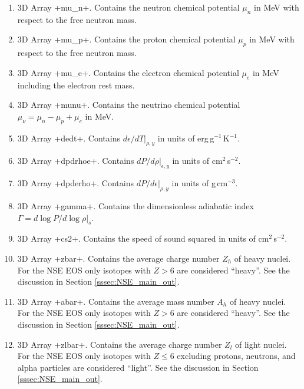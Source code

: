 \documentclass[letterpaper,11pt]{refart}
\begin{document}
\begin{enumerate}
 \item 3D Array \verbprm+mu_n+. Contains the neutron chemical potential $\mu_n$ 
   in MeV with respect to the free neutron mass.

 \item 3D Array \verbprm+mu_p+. Contains the proton chemical potential $\mu_p$ 
   in MeV with respect to the free neutron mass.
   
 \item 3D Array \verbprm+mu_e+. Contains the electron chemical potential $\mu_e$ 
   in MeV including the electron rest mass. 
   
 \item 3D Array \verbprm+munu+. Contains the neutrino chemical potential 
   $\mu_\nu=\mu_n-\mu_p+\mu_e$ in MeV. 
   
 \item 3D Array \verbprm+dedt+. Contains $d\epsilon/dT\vert_{\rho,y}$ in units of
   erg\,g$^{-1}$\,K$^{-1}$. 

 \item 3D Array \verbprm+dpdrhoe+. Contains $dP/d\rho\vert_{\epsilon,y}$ in units of
   cm$^2$\,s$^{-2}$.

  \item 3D Array \verbprm+dpderho+. Contains $dP/d\epsilon\vert_{\rho,y}$ in units of
    g\,cm$^{-3}$.
   
 \item 3D Array \verbprm+gamma+. Contains the dimensionless adiabatic index 
   $\Gamma=d\log P/d\log \rho|_s$.
 
 \item 3D Array \verbprm+cs2+. Contains the speed of sound squared in units of 
   cm$^2$\,s$^{-2}$.
 
 \item 3D Array \verbprm+zbar+. Contains the average charge number $Z_h$ of 
   heavy nuclei. For the NSE EOS only isotopes with $Z>6$ are considered ``heavy''.
   See the discussion in Section \ref{sssec:NSE_main_out}.

 \item 3D Array \verbprm+abar+. Contains the average mass number $A_h$ of 
   heavy nuclei. For the NSE EOS only isotopes with $Z>6$ are considered ``heavy''.
   See the discussion in Section \ref{sssec:NSE_main_out}.

 \item 3D Array \verbprm+zlbar+. Contains the average charge number $Z_l$ of 
   light nuclei. For the NSE EOS only isotopes with $Z\leq6$ excluding protons, 
   neutrons, and alpha particles are considered ``light''. 
   See the discussion in Section \ref{sssec:NSE_main_out}. 
   

\end{enumerate}
\end{document}
